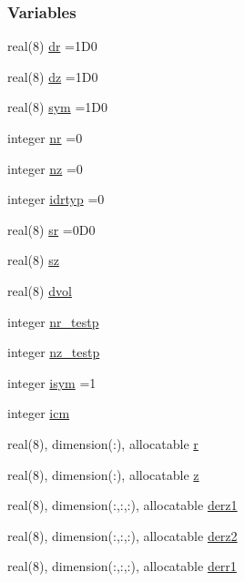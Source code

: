 \subsubsection*{Variables}
\begin{DoxyCompactItemize}
\item 
real(8) \hyperlink{namespacegrid_a1baa9e0cda2fabdcf3c692417f51cb99}{dr} =1\+D0
\item 
real(8) \hyperlink{namespacegrid_af2dd57b4230bb5691266889f867fc507}{dz} =1\+D0
\item 
real(8) \hyperlink{namespacegrid_a5da7a7ed94ce1ad125820c9e731998ab}{sym} =1\+D0
\item 
integer \hyperlink{namespacegrid_adcf6fea7f9e201561e68a1d7c04421c5}{nr} =0
\item 
integer \hyperlink{namespacegrid_ac1e240a950d37771ad366b8b12b3743e}{nz} =0
\item 
integer \hyperlink{namespacegrid_adb8ca41499ab74560e9d97f2511f2cc4}{idrtyp} =0
\item 
real(8) \hyperlink{namespacegrid_ac01da4440df8a87994cbe84c6fe756b1}{sr} =0\+D0
\item 
real(8) \hyperlink{namespacegrid_a1368c70ae54f199b68ccfa8672252bf9}{sz}
\item 
real(8) \hyperlink{namespacegrid_a45853148f801057061a76070e2969573}{dvol}
\item 
integer \hyperlink{namespacegrid_af1ff96c4459cb5671a60fe70e6ce6a3e}{nr\+\_\+testp}
\item 
integer \hyperlink{namespacegrid_a8beb75ae0c827f8dea414882ff08e037}{nz\+\_\+testp}
\item 
integer \hyperlink{namespacegrid_a2aa66619046d86914292b3e3826e6149}{isym} =1
\item 
integer \hyperlink{namespacegrid_aa34e25e6540e6c8bee7767d3bcf0bdee}{icm}
\item 
real(8), dimension(\+:), allocatable \hyperlink{namespacegrid_a179734537d519e50cb4330f69282778c}{r}
\item 
real(8), dimension(\+:), allocatable \hyperlink{namespacegrid_a70452110896f967bfa9712b77c0bd3de}{z}
\item 
real(8), dimension(\+:,\+:,\+:), allocatable \hyperlink{namespacegrid_a16bcad48837c65e5d97745b347cafefc}{derz1}
\item 
real(8), dimension(\+:,\+:,\+:), allocatable \hyperlink{namespacegrid_a524a0741df0c2d7298368fad8a95f621}{derz2}
\item 
real(8), dimension(\+:,\+:,\+:), allocatable \hyperlink{namespacegrid_a927d3ab579693ac5d3d1b383fc47309e}{derr1}

\end{DoxyCompactItemize}
